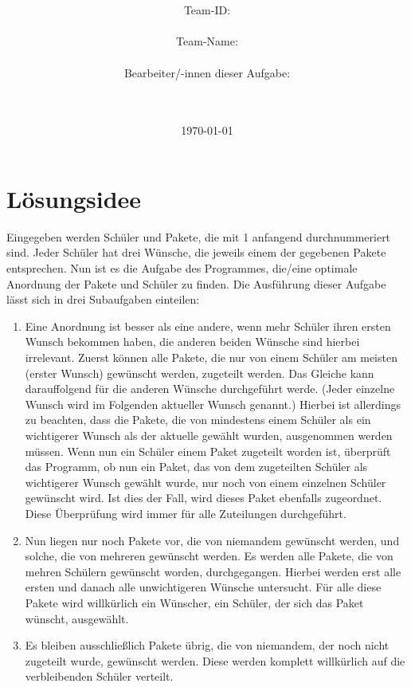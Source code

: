 \documentclass[a4paper,10pt,ngerman]{scrartcl}
\title{\textbf{\Huge\Aufgabe}}
\author{\LARGE Team-ID: \LARGE \TeamId \\\\
	    \LARGE Team-Name: \LARGE \TeamName \\\\
	    \LARGE Bearbeiter/-innen dieser Aufgabe: \\ 
	    \LARGE \Namen\\\\}
\date{\LARGE\today}
\begin{document}
\maketitle
\tableofcontents

\vspace{0.5cm}

\section{Lösungsidee}
\label{sec:loe}

Eingegeben werden Schüler und Pakete, die mit 1 anfangend durchnummeriert sind.
Jeder Schüler hat drei Wünsche, die jeweils einem der gegebenen Pakete entsprechen.
Nun ist es die Aufgabe des Programmes, die/eine optimale Anordnung der Pakete und Schüler zu finden.
Die Ausführung dieser Aufgabe lässt sich in drei Subaufgaben einteilen:
\begin{enumerate}
    \item Eine Anordnung ist besser als eine andere, wenn mehr Schüler ihren ersten Wunsch bekommen haben, die anderen beiden Wünsche sind hierbei irrelevant.
    Zuerst können alle Pakete, die nur von einem Schüler am meisten (erster Wunsch) gewünscht werden, zugeteilt werden.
    Das Gleiche kann darauffolgend für die anderen Wünsche durchgeführt werde.
    (Jeder einzelne Wunsch wird im Folgenden \glqq aktueller Wunsch\grqq{} genannt.)
    Hierbei ist allerdings zu beachten, dass die Pakete, die von mindestens einem Schüler als ein wichtigerer Wunsch als der aktuelle gewählt wurden, ausgenommen werden müssen.
    Wenn nun ein Schüler einem Paket zugeteilt worden ist, überprüft das Programm, ob nun ein Paket, das von dem zugeteilten Schüler als wichtigerer Wunsch gewählt wurde, nur noch von einem einzelnen Schüler gewünscht wird.
    Ist dies der Fall, wird dieses Paket ebenfalls zugeordnet.
    Diese Überprüfung wird immer für alle Zuteilungen durchgeführt.
    \item Nun liegen nur noch Pakete vor, die von niemandem gewünscht werden, und solche, die von mehreren gewünscht werden.
    Es werden alle Pakete, die von mehren Schülern gewünscht worden, durchgegangen. Hierbei werden erst alle ersten und danach alle unwichtigeren Wünsche untersucht.
    Für alle diese Pakete wird willkürlich ein Wünscher, ein Schüler, der sich das Paket wünscht, ausgewählt.
    \item Es bleiben ausschließlich Pakete übrig, die von niemandem, der noch nicht zugeteilt wurde, gewünscht werden. Diese werden komplett willkürlich auf die verbleibenden Schüler verteilt.
\end{enumerate}
\end{document}
